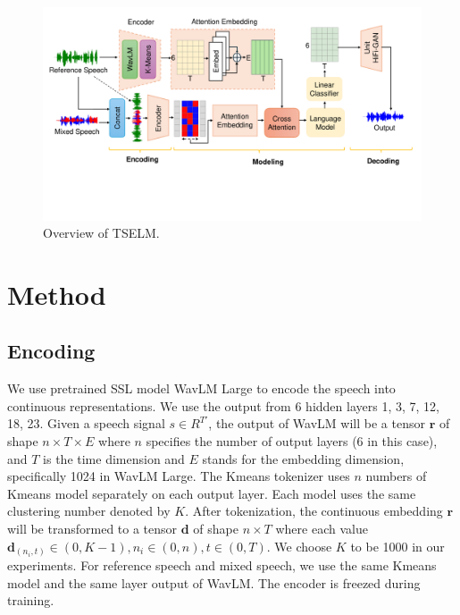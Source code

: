\documentclass[conference]{IEEEtran}
\begin{document}
\begin{figure}[t]
\centering
\includegraphics[width=\textwidth]{assets/model.pdf}
\caption{Overview of TSELM.}
\label{model}
\end{figure}

\section{Method}

\subsection{Encoding}
We use pretrained SSL model WavLM Large \cite{wavlm} to 
encode the speech into continuous representations. We use the output from 6 hidden 
layers 1, 3, 7, 12, 18, 23. Given a speech signal \(s \in R^{T'} \), the output 
of WavLM will be a tensor \(\bm{r}\) of shape \(n \times T \times E\) where 
\(n\) specifies the number 
of output layers (6 in this case), and  \(T\) is the time 
dimension and \(E\) stands for the 
embedding dimension, specifically 1024 in WavLM Large. The Kmeans tokenizer uses \(n\) numbers of  Kmeans model 
separately on each output layer. Each model uses the same clustering number denoted by \(K\).
After tokenization, the continuous embedding \(\bm{r}\) will be transformed to a tensor \(\bm{d}\) of shape \(n \times T\) where each value \(\bm{d}_{(n_i,t)} \in (0, K-1), n_i \in (0,n), t \in 
(0, T)\). We choose \(K\) to be 1000 in our experiments. For reference speech and mixed speech, we 
use the same Kmeans model and the same layer output of WavLM. The encoder is freezed during training.
\end{document}

